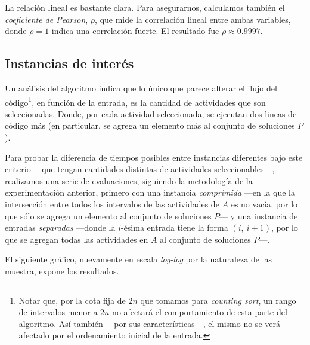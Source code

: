 La relación lineal es bastante clara. Para asegurarnos, calculamos también el \textit{coeficiente de Pearson}, $\rho$, que mide la correlación lineal entre ambas variables, donde $\rho = 1$ indica una correlación fuerte. El resultado fue $\rho \approx 0.9997$.

\subsection{Instancias de interés}

Un análisis del algoritmo indica que lo único que parece alterar el flujo del código\footnote{Notar que, por la cota fija de $2n$ que tomamos para \textit{counting sort}, un rango de intervalos menor a $2n$ no afectará el comportamiento de esta parte del algoritmo. Así también ---por sus características---, el mismo no se verá afectado por el ordenamiento inicial de la entrada.}, en función de la entrada, es 
la cantidad de actividades que son seleccionadas. Donde, por cada actividad seleccionada, se ejecutan dos lineas de código más (en particular, se agrega un elemento más al conjunto de soluciones $P$). %

Para probar la diferencia de tiempos posibles entre instancias diferentes bajo este criterio ---que tengan cantidades distintas de actividades seleccionables---, realizamos una serie de evaluaciones, siguiendo la metodología de la experimentación anterior, primero con una instancia \textit{comprimida} ---en la que la intersección entre todos los intervalos de las actividades de $A$ es no vacía, por lo que sólo se agrega un elemento al conjunto de soluciones $P$--- y una instancia de entradas \textit{separadas} ---donde la $i$-ésima entrada tiene la forma $(i,\ i+1)$, por lo que se agregan todas las actividades en $A$ al conjunto de soluciones $P$---. 

El siguiente gráfico, nuevamente en escala \textit{log-log} por la naturaleza de las muestra, expone los resultados.

